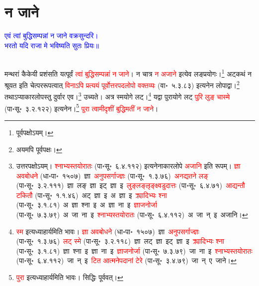 \section[न जाने]{न जाने}
\centering\textcolor{blue}{एवं त्वां बुद्धिसम्पन्नां न जाने वक्रसुन्दरि।\nopagebreak\\
भरतो यदि राजा मे भविष्यति सुतः प्रियः॥}\nopagebreak\\
\\
\fontsize{14}{21}\selectfont\begin{sloppypar}\justifying\noindent\hspace{10mm} मन्थरां कैकेयी प्रशंसति यत्पूर्वं \textcolor{red}{त्वां बुद्धि\-सम्पन्नां न जाने}। न चात्र \textcolor{red}{न अजाने} इत्येव लङ्प्रयोगः।\footnote{पूर्वपक्षोऽयम्।} अट्कथं न श्रूयत इति चेत्पर\-रूपत्वात् \textcolor{red}{विनाऽपि प्रत्ययं पूर्वोत्तर\-पद\-लोपो वक्तव्यः} (वा॰~५.३.८३) इत्यनेन लोपाद्वा।\footnote{अयमपि पूर्वपक्षः।} तथाऽप्याकार\-लोपस्तु दुर्वार एव।\footnote{उत्तरपक्षोऽयम्। \textcolor{red}{श्नाभ्यस्तयोरातः} (पा॰सू॰~६.४.११२) इत्यनेनाकार\-लोपे \textcolor{red}{अजानि} इति रूपम्। \textcolor{red}{ज्ञा अवबोधने} (धा॰पा॰~१५०७)~\arrow ज्ञा~\arrow \textcolor{red}{अनुपसर्गाज्ज्ञः} (पा॰सू॰~१.३.७६)~\arrow \textcolor{red}{अनद्यतने लङ्} (पा॰सू॰~३.२.१११)~\arrow ज्ञा~लङ्~\arrow ज्ञा~इट्~\arrow ज्ञा~इ~\arrow \textcolor{red}{लुङ्लङ्लृङ्क्ष्वडुदात्तः} (पा॰सू॰~६.४.७१)~\arrow \textcolor{red}{आद्यन्तौ टकितौ} (पा॰सू॰~१.१.४६)~\arrow अट्~ज्ञा~इ~\arrow अ~ज्ञा~इ~\arrow \textcolor{red}{क्र्यादिभ्यः श्ना} (पा॰सू॰~३.१.८१)~\arrow अ~ज्ञा~श्ना~इ~\arrow अ~ज्ञा~ना~इ~\arrow \textcolor{red}{ज्ञाजनोर्जा} (पा॰सू॰~७.३.७९)~\arrow अ~जा~ना~इ~\arrow \textcolor{red}{श्नाभ्यस्तयोरातः} (पा॰सू॰~६.४.११२)~\arrow अ~जा~न्~इ~\arrow अजानि।} उच्यते। अत्र स्मयोगे लट्।\footnote{\textcolor{red}{स्म} इत्यध्याहार्यमिति भावः। \textcolor{red}{ज्ञा अवबोधने} (धा॰पा॰~१५०७)~\arrow ज्ञा~\arrow \textcolor{red}{अनुपसर्गाज्ज्ञः} (पा॰सू॰~१.३.७६)~\arrow \textcolor{red}{लट् स्मे} (पा॰सू॰~३.२.११८)~\arrow ज्ञा~लट्~\arrow ज्ञा~इट्~\arrow ज्ञा~इ~\arrow \textcolor{red}{क्र्यादिभ्यः श्ना} (पा॰सू॰~३.१.८१)~\arrow ज्ञा~श्ना~इ~\arrow ज्ञा~ना~इ~\arrow \textcolor{red}{ज्ञाजनोर्जा} (पा॰सू॰~७.३.७९)~\arrow जा~ना~इ~\arrow \textcolor{red}{श्नाभ्यस्तयोरातः} (पा॰सू॰~६.४.११२)~\arrow जा~न्~इ~\arrow \textcolor{red}{टित आत्मनेपदानां टेरे} (पा॰सू॰~३.४.७९)~\arrow जा~न्~ए~\arrow जाने।} यद्वा पुरा\-योगे लट् \textcolor{red}{पुरि लुङ् चास्मे} (पा॰सू॰~३.२.१२२) इत्यनेन।\footnote{\textcolor{red}{पुरा} इत्यध्याहार्यमिति भावः। सिद्धिः पूर्ववत्।} \textcolor{red}{पुरा त्वामीदृशीं बुद्धिमतीं न जाने}।\end{sloppypar}
